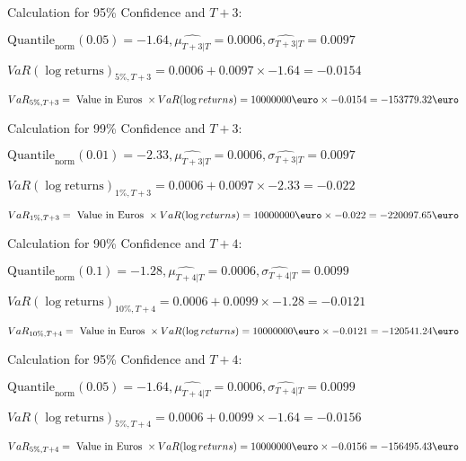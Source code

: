 Calculation for 95\% Confidence and $T+3$:

\indent\indent $\text{Quantile}_\text{norm}(0.05) = -1.64,\hat{\mu_{T+3|T}} = 0.0006, \hat{\sigma_{T+3|T}} = 0.0097$

\indent\indent $VaR(\log \text{returns})_{5\%, T + 3} = 0.0006 + 0.0097\times-1.64 = -0.0154$

\indent\indent $VaR_{5\%, T + 3} = \text{ Value in Euros } \times VaR(\log returns) = 10 000 000 \text{\euro} \times-0.0154 = -153779.32 \text{\euro}$\newline




Calculation for 99\% Confidence and $T+3$:

\indent\indent $\text{Quantile}_\text{norm}(0.01) = -2.33,\hat{\mu_{T+3|T}} = 0.0006, \hat{\sigma_{T+3|T}} = 0.0097$

\indent\indent $VaR(\log \text{returns})_{1\%, T + 3} = 0.0006 + 0.0097\times-2.33 = -0.022$

\indent\indent $VaR_{1\%, T + 3} = \text{ Value in Euros } \times VaR(\log returns) = 10 000 000 \text{\euro} \times-0.022 = -220097.65 \text{\euro}$\newline




Calculation for 90\% Confidence and $T+4$:

\indent\indent $\text{Quantile}_\text{norm}(0.1) = -1.28,\hat{\mu_{T+4|T}} = 0.0006, \hat{\sigma_{T+4|T}} = 0.0099$

\indent\indent $VaR(\log \text{returns})_{10\%, T + 4} = 0.0006 + 0.0099\times-1.28 = -0.0121$

\indent\indent $VaR_{10\%, T + 4} = \text{ Value in Euros } \times VaR(\log returns) = 10 000 000 \text{\euro} \times-0.0121 = -120541.24 \text{\euro}$\newline




Calculation for 95\% Confidence and $T+4$:

\indent\indent $\text{Quantile}_\text{norm}(0.05) = -1.64,\hat{\mu_{T+4|T}} = 0.0006, \hat{\sigma_{T+4|T}} = 0.0099$

\indent\indent $VaR(\log \text{returns})_{5\%, T + 4} = 0.0006 + 0.0099\times-1.64 = -0.0156$

\indent\indent $VaR_{5\%, T + 4} = \text{ Value in Euros } \times VaR(\log returns) = 10 000 000 \text{\euro} \times-0.0156 = -156495.43 \text{\euro}$\newline




